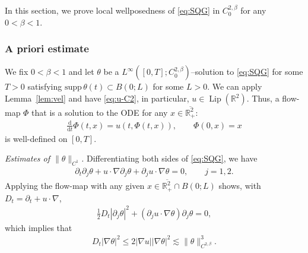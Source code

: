 \documentclass[10pt]{amsart}
\theoremstyle{definition}
\theoremstyle{remark}
\numberwithin{equation}{section}
\newcommand{\supp}{{\mathrm{supp}}\,}
\newcommand{\ud}{\mathrm{d}}
\newcommand{\rd}{\partial}
\newcommand{\nb}{\nabla}
\newcommand{\0}{\emptyset}
\newcommand{\ohp}{\overline{\bbR^2_+}}
\newcommand{\tht}{\theta}
\newcommand{\bbR}{\mathbb R}
\begin{document}
		In this section, we prove local wellposedness of \eqref{eq:SQG} in $C^{2,\beta}_0$ for any $0 < \beta < 1$. 
		
		\subsubsection{A priori estimate}
		
		We fix $0 < \beta < 1$ and let $\tht$ be a $L^{\infty}([0,T];C^{2,\beta}_0)$--solution to \eqref{eq:SQG} for some $T>0$ satisfying $\supp \tht(t) \subset B(0;L)$ for some $L>0$. We can apply Lemma~\ref{lem:vel} and have \eqref{eq:u-C2}, in particular, $u \in \operatorname{Lip}(\mathbb{R}^2)$. Thus, a flow-map $\Phi$ that is a solution to the ODE for any $x \in \ohp$: \begin{equation}\label{eq:flow-map}
				\begin{split}
					\frac{\ud}{\ud t} \Phi(t,x) = u(t,\Phi(t,x)), \qquad \Phi(0,x) = x
				\end{split}
			\end{equation} is well-defined on $[0,T]$.	\medskip 
		
		\noindent \textit{Estimates of $\| \tht \|_{C^{1}}$.} Differentiating both sides of \eqref{eq:SQG}, we have \begin{equation}\label{eq:tht-j}
			\begin{split}
				\partial_t \partial_j \tht + u \cdot \nabla \partial_j \tht + \partial_j u \cdot \nabla \tht = 0, \qquad j = 1,2.
			\end{split}
		\end{equation} Applying the flow-map with any given $x \in \ohp \cap B(0;L)$ shows, with $D_{t} = \rd_{t} + u \cdot \nb $, \begin{equation*}
			\begin{split}
				\frac{1}{2} D_t |\partial_j \tht|^2 + (\partial_j u \cdot \nabla \tht )\partial_j \tht = 0,
			\end{split}
		\end{equation*} which implies that \begin{equation*}
			\begin{split}
				D_t |\nabla \tht|^2 \leq 2|\nabla u| |\nabla \tht|^2 \lesssim \| \tht \|_{C^{2,\beta}}^3.
			\end{split}
		\end{equation*}  	\medskip 
		
\end{document}

